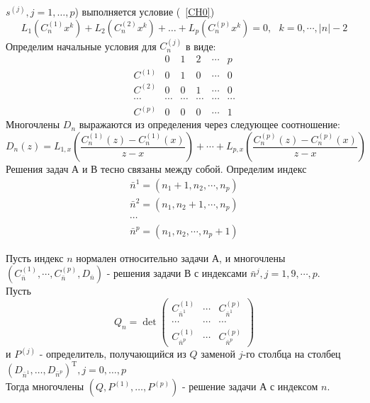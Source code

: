${s^{(j)}},j=1,\ldots,p$) выполняется условие (~\ref{CH0})
$$%
L_1(C_n^{(1)}x^k)+L_2(C_n^{(2)}x^k)+\ldots+L_p(C_n^{(p)}x^k)=0,
\mbox{   } k=0,\cdots,|n|-2 $$%
Определим начальные условия для $C_n^{(j)}$ в виде:
$$%
\begin{array} {rcccccccccccccc}
        & 0 & 1 & 2 & \cdots & p \nonumber \\
C^{(1)} & 0 & 1 & 0 & \cdots & 0 \nonumber \\
C^{(2)} & 0 & 0 & 1 & \cdots & 0 \nonumber \\
\cdots  & \cdots & \cdots & \cdots & \cdots & \cdots \nonumber \\
C^{(p)} & 0 & 0 & 0 & \cdots & 1 \nonumber
\end{array}
$$%
Многочлены $D_n$ выражаются из определения через следующее
соотношение:
$$%
D_n(z)=L_{1,x}\left( \frac{C_n^{(1)}(z)-C_n^{(1)}(x)} {z-x}
\right)+ \cdots+L_{p,x}\left( \frac{C_n^{(p)}(z)-C_n^{(p)}(x)}
{z-x} \right)
$$%
Решения задач А и В тесно связаны между собой. Определим индекс
\begin{eqnarray}
\bar{n}^{1} = (n_1+1,n_2,\cdots, n_p) \nonumber \\
\bar{n}^{2} = (n_1,n_2+1,\cdots, n_p) \nonumber \\
\cdots \nonumber \\
\bar{n}^{p} = (n_1,n_2,\cdots, n_p+1) \nonumber
\end{eqnarray}
\begin{teor}
Пусть индекс $n$ нормален относительно задачи А, и
многочлены
$(C^{(1)}_{\bar{n}},\cdots,C^{(p)}_{\bar{n}},D_{\bar{n}})$ -
 решения задачи В с индексами $\bar{n}^{j}, j=1,9,\cdots,p$. \\
Пусть
$$%
Q_n = \det \left( \begin{array}{ccccccccccccc}
C^{(1)}_{\bar{n}^{1}} & \cdots & C^{(p)}_{\bar{n}^{1}}
\\
\cdots & \cdots & \cdots \\
C^{(1)}_{\bar{n}^{p}} & \cdots & C^{(p)}_{\bar{n}^{p}}
\end{array}\right)
$$%
 и $P^{(j)}$ - определитель, получающийся из $Q$ заменой $j$-го
столбца на столбец
$(D_{{\bar{n}^{1}}},\ldots,D_{{\bar{n}^{p}}})^{\mbox{T}},j=0,\ldots,p$
\\
Тогда многочлены $(Q, P^{(1)},\ldots,P^{(p)})$ - решение задачи А
с индексом $n$. \\
\end{teor}
